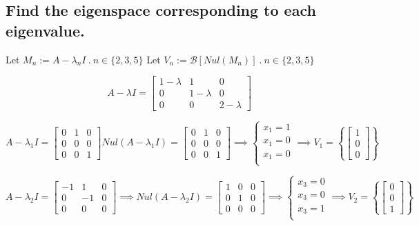\subsection{Find the eigenspace corresponding to each eigenvalue.}
\begin{center}
	Let $M_n := A-\lambda_n I ~.~ n \in \{ 2,3,5 \}$ \quad\quad Let $V_n := \mathscr{B}[Nul(M_n)] ~.~ n \in \{ 2,3,5 \}$
\end{center}
\[
	A-\lambda I = \begin{bmatrix}
		1-\lambda & 1         & 0         \\
		0         & 1-\lambda & 0         \\
		0         & 0         & 2-\lambda
	\end{bmatrix}
\]

\[
	A-\lambda_1 I =
	\begin{bmatrix}
		0 & 1 & 0 \\
		0 & 0 & 0 \\
		0 & 0 & 1
	\end{bmatrix}
	Nul(A-\lambda_1 I) =
	\begin{bmatrix}
		0 & 1 & 0 \\
		0 & 0 & 0 \\
		0 & 0 & 1
	\end{bmatrix} \implies
	\begin{cases}
		x_1 = 1 \\
		x_1 = 0 \\
		x_1 = 0 \\
	\end{cases} \implies
	V_1 = \left\{
	\begin{bmatrix} 1 \\ 0 \\ 0 \end{bmatrix}
	\right\}
\]

\[
	A-\lambda_2 I =
	\begin{bmatrix}
		-1 & 1  & 0 \\
		0  & -1 & 0 \\
		0  & 0  & 0
	\end{bmatrix} \implies Nul(A-\lambda_2 I) =
	\begin{bmatrix}1&0&0\\ 0&1&0\\ 0&0&0\end{bmatrix} \implies
	\begin{cases}
		x_3 = 0 \\
		x_3 = 0 \\
		x_3 = 1 \\
	\end{cases} \implies
	V_2 = \left\{
	\begin{bmatrix} 0 \\ 0 \\ 1 \end{bmatrix}
	\right\}
\]
